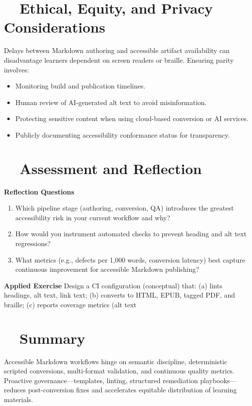 \section{~~Ethical, Equity, and Privacy Considerations}\label{ch19:sec:ethics-equity}
Delays between Markdown authoring and accessible artifact availability can disadvantage learners dependent on screen readers or braille. Ensuring parity involves:
\begin{itemize}
	\item Monitoring build  and publication timelines.
	\item Human review of AI-generated alt text to avoid misinformation.
	\item Protecting sensitive content when using cloud-based conversion or AI services.
	\item Publicly documenting accessibility conformance status for transparency.
\end{itemize}

\section{~~Assessment and Reflection}\label{ch19:sec:assessment-reflection}
\textbf{Reflection Questions}
\begin{enumerate}
	\item Which pipeline stage (authoring, conversion, QA) introduces the greatest accessibility risk in your current workflow and why?
	\item How would you instrument automated checks to prevent heading and alt text regressions?
	\item What metrics (e.g., defects per 1,000 words, conversion latency) best capture continuous improvement for accessible Markdown publishing?
\end{enumerate}
\textbf{Applied Exercise} Design a CI configuration (conceptual) that: (a) lints headings, alt text, link text; (b) converts to HTML, EPUB, tagged PDF, and braille; (c) reports coverage metrics (alt text %

\section{~~Summary}\label{ch19:sec:summary}
Accessible Markdown workflows hinge on semantic discipline, deterministic scripted conversions, multi-format validation, and continuous quality metrics. Proactive governance—templates, linting, structured remediation playbooks—reduces post-conversion fixes and accelerates equitable distribution of learning materials.

